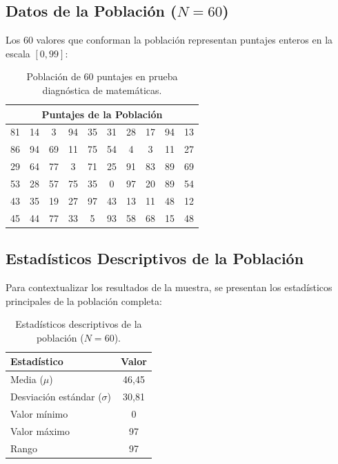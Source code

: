 \documentclass[12pt,a4paper]{article}
\begin{document}
\subsection{Datos de la Población ($N = 60$)}

Los 60 valores que conforman la población representan puntajes enteros en la escala $[0, 99]$:

\begin{table}[H]
  \centering
  \caption{Población de 60 puntajes en prueba diagnóstica de matemáticas.}
  \begin{tabular}{cccccccccc}
    \toprule
    \multicolumn{10}{c}{\textbf{Puntajes de la Población}} \\
    \midrule
    81 & 14 &  3 & 94 & 35 & 31 & 28 & 17 & 94 & 13 \\
    86 & 94 & 69 & 11 & 75 & 54 &  4 &  3 & 11 & 27 \\
    29 & 64 & 77 &  3 & 71 & 25 & 91 & 83 & 89 & 69 \\
    53 & 28 & 57 & 75 & 35 &  0 & 97 & 20 & 89 & 54 \\
    43 & 35 & 19 & 27 & 97 & 43 & 13 & 11 & 48 & 12 \\
    45 & 44 & 77 & 33 &  5 & 93 & 58 & 68 & 15 & 48 \\
    \bottomrule
  \end{tabular}
\end{table}

\subsection{Estadísticos Descriptivos de la Población}

Para contextualizar los resultados de la muestra, se presentan los estadísticos principales de
la población completa:

\begin{table}[H]
  \centering
  \caption{Estadísticos descriptivos de la población ($N = 60$).}
  \begin{tabular}{lc}
    \toprule
    \textbf{Estadístico} & \textbf{Valor} \\
    \midrule
    Media ($\mu$)             & 46{,}45 \\
    Desviación estándar ($\sigma$) & 30{,}81 \\
    Valor mínimo              & 0       \\
    Valor máximo              & 97      \\
    Rango                     & 97      \\
    \bottomrule
  \end{tabular}
\end{table}
\end{document}

